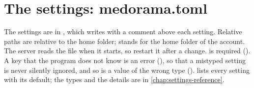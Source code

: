 \section{The settings: medorama.toml}
\label{sec:administration-settings}

The settings are in , which  writes with a comment above
each setting. Relative paths are relative to the home folder; \code{\textasciitilde} stands for
the home folder of the account. The server reads the file when it starts, so restart it after a
change.  is required (). A key that the
program does not know is an error (), so that a mistyped setting is
never silently ignored, and so is a value of the wrong type ().
 lists every setting with its default; the types and the
details are in \cref{chap:settings-reference}.

